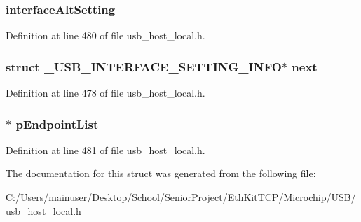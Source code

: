 \subsubsection[{interface\+Alt\+Setting}]{ interface\+Alt\+Setting}\label{struct___u_s_b___i_n_t_e_r_f_a_c_e___s_e_t_t_i_n_g___i_n_f_o_a98dcaa9ba2f52c486344aff447229585}


Definition at line 480 of file usb\+\_\+host\+\_\+local.\+h.

\hypertarget{struct___u_s_b___i_n_t_e_r_f_a_c_e___s_e_t_t_i_n_g___i_n_f_o_a937e8231da028f8464d6145526ce9332}{}
\subsubsection[{next}]{\setlength{\rightskip}{0pt plus 5cm}struct {\bf \+\_\+\+U\+S\+B\+\_\+\+I\+N\+T\+E\+R\+F\+A\+C\+E\+\_\+\+S\+E\+T\+T\+I\+N\+G\+\_\+\+I\+N\+F\+O}$\ast$ next}\label{struct___u_s_b___i_n_t_e_r_f_a_c_e___s_e_t_t_i_n_g___i_n_f_o_a937e8231da028f8464d6145526ce9332}


Definition at line 478 of file usb\+\_\+host\+\_\+local.\+h.

\hypertarget{struct___u_s_b___i_n_t_e_r_f_a_c_e___s_e_t_t_i_n_g___i_n_f_o_a8a0aeb0f0802cc4fcf7ebd3f20248ebe}{}
\subsubsection[{p\+Endpoint\+List}]{$\ast$ p\+Endpoint\+List}\label{struct___u_s_b___i_n_t_e_r_f_a_c_e___s_e_t_t_i_n_g___i_n_f_o_a8a0aeb0f0802cc4fcf7ebd3f20248ebe}


Definition at line 481 of file usb\+\_\+host\+\_\+local.\+h.



The documentation for this struct was generated from the following file\+:\begin{DoxyCompactItemize}
\item 
C\+:/\+Users/mainuser/\+Desktop/\+School/\+Senior\+Project/\+Eth\+Kit\+T\+C\+P/\+Microchip/\+U\+S\+B/\hyperlink{usb__host__local_8h}{usb\+\_\+host\+\_\+local.\+h}\end{DoxyCompactItemize}
